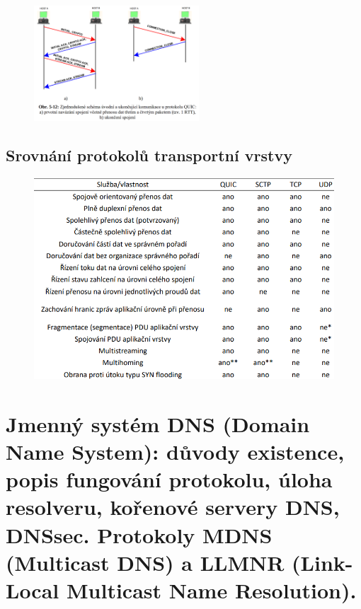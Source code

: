 \begin{figure}[!h]
    \centering
    \includegraphics[width=0.55\textwidth]{obrazky/036.png}
\end{figure}

\subsection{Srovnání protokolů transportní vrstvy}
\begin{figure}[!ht]
\begin{center}
    \includegraphics[scale=0.7]{obrazky/porovnani_proto.png}
  \end{center}
\end{figure}

\clearpage
\section{Jmenný systém DNS (Domain Name System): důvody existence, popis fungování protokolu, úloha resolveru, kořenové servery DNS, DNSsec. Protokoly MDNS (Multicast DNS) a LLMNR (Link-Local Multicast Name Resolution).}

